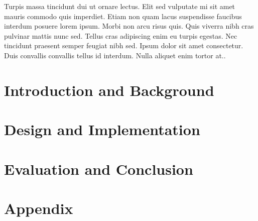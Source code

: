 \documentclass[UKenglish]{ifimaster}  %
\begin{document}
    Turpis massa tincidunt dui ut ornare lectus. Elit sed vulputate mi sit amet mauris commodo quis imperdiet. Etiam non quam lacus suspendisse faucibus interdum posuere lorem ipsum. Morbi non arcu risus quis. Quis viverra nibh cras pulvinar mattis nunc sed. Tellus cras adipiscing enim eu turpis egestas. Nec tincidunt praesent semper feugiat nibh sed. Ipsum dolor sit amet consectetur. Duis convallis convallis tellus id interdum. Nulla aliquet enim tortor at..

\tableofcontents

\listoftables

\listoffigures

\mainmatter{}

\part{Introduction and Background}




\part{Design and Implementation}



\part{Evaluation and Conclusion}




\part*{Appendix}

\appendix{}


\backmatter{}
\printbibliography
\end{document}
